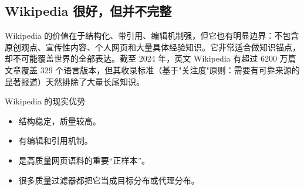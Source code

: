 \subsection{Wikipedia 很好，但并不完整}

Wikipedia 的价值在于结构化、带引用、编辑机制强，但它也有明显边界：不包含原创观点、宣传性内容、个人网页和大量具体经验知识。它非常适合做知识锚点，却不可能覆盖世界的全部表达。截至 2024 年，英文 Wikipedia 有超过 6200 万篇文章覆盖 329 个语言版本，但其收录标准（基于"关注度"原则：需要有可靠来源的显著报道）天然排除了大量长尾知识。

\begin{knowledgebox}{Wikipedia 的现实优势}
\begin{itemize}
    \item 结构稳定，质量较高。
    \item 有编辑和引用机制。
    \item 是高质量网页语料的重要“正样本”。
    \item 很多质量过滤器都把它当成目标分布或代理分布。
\end{itemize}
\end{knowledgebox}

